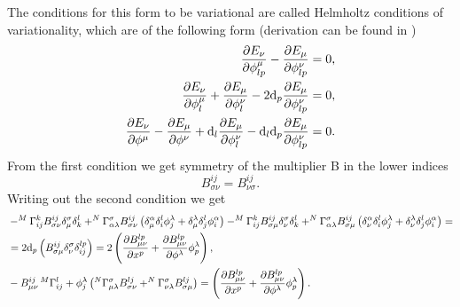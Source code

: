 \documentclass[english]{article}
\begin{document}
The conditions for this form to be variational are called Helmholtz conditions of variationality, which are of the following form (derivation can be found in \cite{kru})
\begin{align}
\label{1HP}
\frac{\partial E_\nu}{\partial \phi^\mu_{lp}}-\frac{\partial E_\mu}{\partial \phi^\nu_{lp}}&=0,\\
\label{2HP}
\frac{\partial E_\nu}{\partial \phi^\mu_{l}}+\frac{\partial E_\mu}{\partial \phi^\nu_{l}}-2{\rm d}_p\frac{\partial E_\mu}{\partial \phi^\nu_{lp}}&=0,\\
\label{3HP}
\frac{\partial E_\nu}{\partial \phi^\mu}-\frac{\partial E_\mu}{\partial \phi^\nu}+{\rm d}_l\frac{\partial E_\mu}{\partial \phi^\nu_{l}}-{\rm d}_l{\rm d}_p\frac{\partial E_\mu}{\partial \phi^\nu_{lp}}&=0.
\end{align}
From the first condition we get symmetry of the multiplier B in the lower indices
$$
B^{ij}_{\sigma\nu}=B^{ij}_{\nu\sigma}.
$$
Writing out the second condition we get 
\begin{align*}
&-^M\Gamma^k_{ij}B^{ij}_{\sigma\nu}\delta_\mu^\sigma\delta^l_k
+^N\Gamma^\sigma_{\alpha\lambda}B^{ij}_{\sigma\nu}\left(\delta^\alpha_\mu\delta^l_i\phi^\lambda_j+\delta^\lambda_\mu\delta^l_j\phi^\alpha_i\right)
-^M\Gamma^k_{ij}B^{ij}_{\sigma\mu}\delta_\nu^\sigma\delta^l_k
+^N\Gamma^\sigma_{\alpha\lambda}B^{ij}_{\sigma\mu}\left(\delta^\alpha_\nu\delta^l_i\phi^\lambda_j+\delta^\lambda_\nu\delta^l_j\phi^\alpha_i\right)=\\
&=2{\rm d}_p\left(B^{ij}_{\sigma\mu}\delta^\sigma_\nu\delta^{lp}_{ij}\right)=2\left(\frac{\partial B^{lp}_{\mu\nu}}{\partial x^p}+\frac{\partial B^{lp}_{\mu\nu}}{\partial \phi^\lambda}\phi^\lambda_p\right),
\\
&-B^{ij}_{\mu\nu}\,^M\Gamma^l_{ij}+\phi^\lambda_j\left(^N\Gamma^\sigma_{\mu\lambda}B^{lj}_{\sigma\nu}+^N\Gamma^\sigma_{\nu\lambda}B^{lj}_{\sigma\mu}\right)=\left(\frac{\partial B^{lp}_{\mu\nu}}{\partial x^p}+\frac{\partial B^{lp}_{\mu\nu}}{\partial \phi^\lambda}\phi^\lambda_p\right).
\end{align*}
\end{document}
